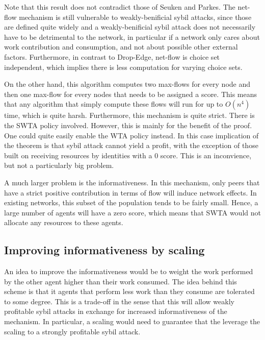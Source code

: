 \documentclass[a4paper,11pt]{book}
\theoremstyle{definition}
\begin{document}
Note that this result does not contradict those of Seuken and Parkes. The net-flow mechanism is
still vulnerable to weakly-benificial sybil attacks, since those are defined quite widely and
a weakly-benificial sybil attack does not necessarily have to be detrimental to the network,
in particular if a network only cares about work contribution and consumption, and
not about possible other external factors. Furthermore, in contrast to Drop-Edge, net-flow
is choice set independent, which implies there is less computation for varying choice sets.

On the other hand, this algorithm computes two max-flows for every node and then one max-flow for
every nodes that needs to be assigned a score. This means that any algorithm that simply compute
these flows will run for up to $O(n^4)$ time, which is quite harsh. 
Furthermore, this mechanism is quite strict. There is the SWTA policy involved. However,
this is mainly for the benefit of the proof. One could quite easily enable the WTA policy instead.
In this case implication of the theorem is that sybil attack cannot yield a profit, with the exception
of those built on receiving resources by identities with a $0$ score. This is an inconvience,
but not a particularly big problem. 

A much larger problem is the informativeness. In this mechanism,
only peers that have a strict positive contribution in terms of flow will induce network effects.
In existing networks, this subset of the population tends to be fairly small. Hence, a large
number of agents will have a zero score, which means that SWTA would not allocate any resources
to these agents.

\subsection{Improving informativeness by scaling}
An idea to improve the informativeness would be to weight the work performed by the other
agent higher than their work consumed. The idea behind this scheme is that it agents
that perform less work than they consume are tolerated to some degree. This is a trade-off
in the sense that this will allow weakly profitable sybil attacks in exchange for increased
informativeness of the mechanism. In particular, a scaling would need to guarantee
that the leverage the scaling to a strongly profitable sybil attack. 
\end{document}
